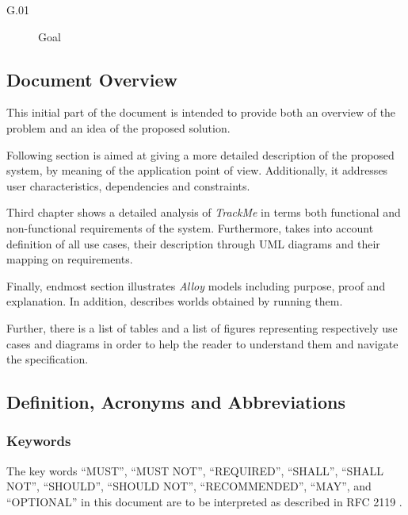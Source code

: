\documentclass[a4paper]{article}
\begin{document}
        \begin{description}
            \item[G.01] Goal
        \end{description}
    
    \subsection{Document Overview}
        This initial part of the document is intended to provide both an overview of the problem and an idea of the proposed solution.
        
        Following section is aimed at giving a more detailed description of the proposed system, by meaning of the application point of view. Additionally, it addresses user characteristics, dependencies and constraints.
        
        Third chapter shows a detailed analysis of \textit{TrackMe} in terms both functional and non-functional requirements of the system. Furthermore, takes into account definition of all use cases, their description through UML diagrams and their mapping on requirements.
        
        Finally, endmost section illustrates \textit{Alloy} models including purpose, proof and explanation. In addition, describes worlds obtained by running them.
        
        Further, there is a list of tables and a list of figures representing respectively use cases and diagrams in order to help the reader to understand them and navigate the specification.
        
    \subsection{Definition, Acronyms and  Abbreviations}
            \subsubsection{Keywords}
            The key words “MUST”, “MUST NOT”, “REQUIRED”, “SHALL”, “SHALL NOT”, “SHOULD”, “SHOULD NOT”, “RECOMMENDED”, “MAY”, and “OPTIONAL” in this document are to be interpreted as described in RFC 2119 \cite{bradner1997key}.
\end{document}
